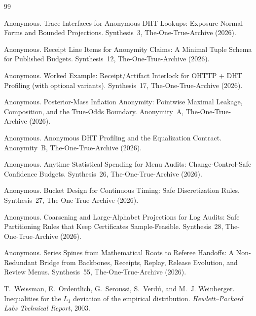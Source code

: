 \documentclass[11pt]{article}
\begin{document}
\begin{thebibliography}{99}\small

Anonymous.
\newblock Trace Interfaces for Anonymous DHT Lookups: Exposure Normal Forms and Bounded Projections.
\newblock Synthesis~3, The-One-True-Archive (2026).

Anonymous.
\newblock Receipt Line Items for Anonymity Claims: A Minimal Tuple Schema for Published Budgets.
\newblock Synthesis~12, The-One-True-Archive (2026).

Anonymous.
\newblock Worked Example: Receipt/Artifact Interlock for OHTTP + DHT Profiling (with optional variants).
\newblock Synthesis~17, The-One-True-Archive (2026).

Anonymous.
\newblock Posterior-Mass Inflation Anonymity: Pointwise Maximal Leakage, Composition, and the True-Odds Boundary.
\newblock Anonymity~A, The-One-True-Archive (2026).

Anonymous.
\newblock Anonymous DHT Profiling and the Equalization Contract.
\newblock Anonymity~B, The-One-True-Archive (2026).

Anonymous.
\newblock Anytime Statistical Spending for Menu Audits: Change-Control-Safe Confidence Budgets.
\newblock Synthesis~26, The-One-True-Archive (2026).

Anonymous.
\newblock Bucket Design for Continuous Timing: Safe Discretization Rules.
\newblock Synthesis~27, The-One-True-Archive (2026).

Anonymous.
\newblock Coarsening and Large-Alphabet Projections for Log Audits: Safe Partitioning Rules that Keep Certificates Sample-Feasible.
\newblock Synthesis~28, The-One-True-Archive (2026).

Anonymous.
\newblock Series Spines from Mathematical Roots to Referee Handoffs: A Non-Redundant Bridge from Backbones, Receipts, Replay, Release Evolution, and Review Menus.
\newblock Synthesis~55, The-One-True-Archive (2026).

T.~Weissman, E.~Ordentlich, G.~Seroussi, S.~Verd\'u, and M.~J. Weinberger.
\newblock Inequalities for the $L_1$ deviation of the empirical distribution.
\newblock \emph{Hewlett--Packard Labs Technical Report}, 2003.

\end{thebibliography}
\end{document}
